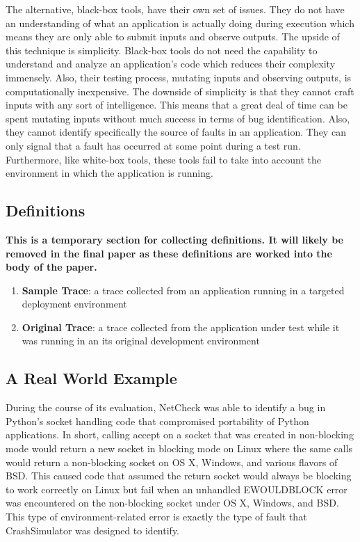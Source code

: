         The alternative, black-box tools, have their own set of issues. They do not have an understanding of what an
        application is actually doing during execution which means they are only able to submit inputs and observe
        outputs.  The upside of this technique is simplicity. Black-box tools do not need the capability to understand
        and analyze an application's code which reduces their complexity immensely. Also, their testing process,
        mutating inputs and observing outputs, is computationally inexpensive. The downside of simplicity is that they
        cannot craft inputs with any sort of intelligence. This means that a great deal of time can be spent mutating
        inputs without much success in terms of bug identification. Also, they cannot identify specifically the source
        of faults in an application. They can only signal that a fault has occurred at some point during a test run.
        Furthermore, like white-box tools, these tools fail to take into account the environment in which the
        application is running.

    \subsection{Definitions}
        \textbf{This is a temporary section for collecting definitions. It will likely be removed in the final paper as
        these definitions are worked into the body of the paper.}
        \begin{enumerate}
            \item{\textbf{Sample Trace}: a trace collected from an application running in a targeted deployment
                environment}
            \item{\textbf{Original Trace}: a trace collected from the application under test while it was running in an
                its original development environment}
        \end{enumerate}

    \subsection{A Real World Example}

        During the course of its evaluation, NetCheck was able to identify a bug in Python's socket handling code that
        compromised portability of Python applications. In short, calling accept on a socket that was created in
        non-blocking mode would return a new socket in blocking mode on Linux where the same calls would return a
        non-blocking socket on OS X, Windows, and various flavors of BSD\@. This caused code that assumed the return
        socket would always be blocking to work correctly on Linux but fail when an unhandled EWOULDBLOCK error was
        encountered on the non-blocking socket under OS X, Windows, and BSD\@. This type of environment-related error is
        exactly the type of fault that CrashSimulator was designed to identify.
